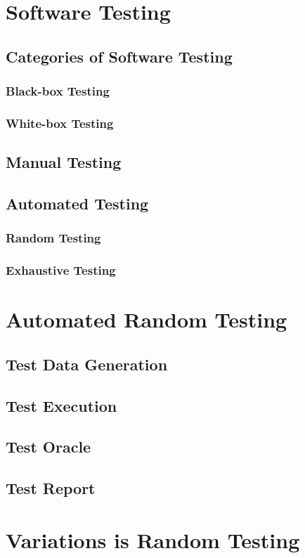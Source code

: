 
\section{Software Testing}
\subsection{Categories of Software Testing}
\subsubsection{Black-box Testing}
\subsubsection{White-box Testing}
\subsection{Manual Testing}
\subsection{Automated Testing}
\subsubsection{Random Testing}
\subsubsection{Exhaustive Testing}

\section{Automated Random Testing}
\subsection{Test Data Generation}
\subsection{Test Execution}
\subsection{Test Oracle}
\subsection{Test Report}

\section{Variations is Random Testing}
